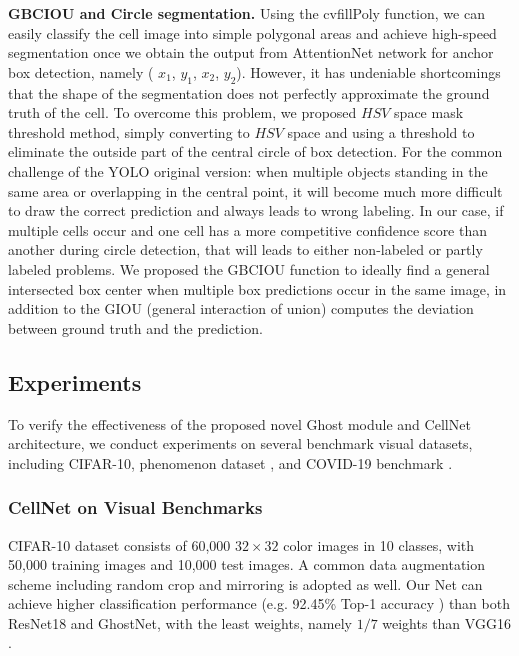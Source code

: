 \textbf{GBCIOU and Circle segmentation.} Using the cvfillPoly function, we can easily classify the cell image into simple polygonal areas and achieve high-speed segmentation once we obtain the output from AttentionNet network for anchor box detection, namely ( $x_{1}$, $y_{1}$, $x_{2}$, $y_{2}$). However, it has undeniable shortcomings that the shape of the segmentation does not perfectly approximate the ground truth of the cell. To overcome this problem, we proposed $HSV$ space mask threshold method, simply converting to $HSV$ space and using a threshold to eliminate the outside part of the central circle of box detection.  For the common challenge of the YOLO original version: when multiple objects standing in the same area or overlapping in the central point, it will become much more difficult to draw the correct prediction and always leads to wrong labeling. In our case, if multiple cells occur and one cell has a more competitive confidence score than another during circle detection, that will leads to either non-labeled or partly labeled problems.
We proposed the GBCIOU function to ideally find a general intersected box center when multiple box predictions occur in the same image, in addition to the GIOU (general interaction of union) computes the deviation between ground truth and the prediction.



\subsection{Experiments}
To verify the effectiveness of the proposed novel Ghost module and CellNet architecture, we conduct experiments on several benchmark visual datasets, including CIFAR-10\cite{21}, phenomenon dataset \cite{38}, and COVID-19 benchmark \cite{36}\cite{37}. 


\subsubsection{CellNet on Visual Benchmarks}



CIFAR-10 dataset\cite{21} consists of 60,000 $32 \times 32$ color images in 10 classes, with 50,000 training images and 10,000 test images. A common data augmentation scheme including random crop\cite{22} and mirroring\cite{19} is adopted as well. Our Net can achieve higher classification performance  (e.g.  92.45\%  Top-1  accuracy  ) than both ResNet18 and GhostNet, with the least  weights, namely $1/7$ weights than VGG16 \cite{23}. 



